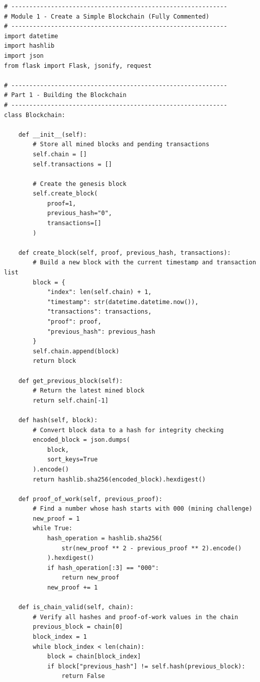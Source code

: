 \documentclass[12pt,a4paper]{article}
\begin{document}
\begin{lstlisting}[style=pythonstyle]
# ------------------------------------------------------------
# Module 1 - Create a Simple Blockchain (Fully Commented)
# ------------------------------------------------------------
import datetime
import hashlib
import json
from flask import Flask, jsonify, request

# ------------------------------------------------------------
# Part 1 - Building the Blockchain
# ------------------------------------------------------------
class Blockchain:

    def __init__(self):
        # Store all mined blocks and pending transactions
        self.chain = []
        self.transactions = []

        # Create the genesis block
        self.create_block(
            proof=1,
            previous_hash="0",
            transactions=[]
        )

    def create_block(self, proof, previous_hash, transactions):
        # Build a new block with the current timestamp and transaction list
        block = {
            "index": len(self.chain) + 1,
            "timestamp": str(datetime.datetime.now()),
            "transactions": transactions,
            "proof": proof,
            "previous_hash": previous_hash
        }
        self.chain.append(block)
        return block

    def get_previous_block(self):
        # Return the latest mined block
        return self.chain[-1]

    def hash(self, block):
        # Convert block data to a hash for integrity checking
        encoded_block = json.dumps(
            block,
            sort_keys=True
        ).encode()
        return hashlib.sha256(encoded_block).hexdigest()

    def proof_of_work(self, previous_proof):
        # Find a number whose hash starts with 000 (mining challenge)
        new_proof = 1
        while True:
            hash_operation = hashlib.sha256(
                str(new_proof ** 2 - previous_proof ** 2).encode()
            ).hexdigest()
            if hash_operation[:3] == "000":
                return new_proof
            new_proof += 1

    def is_chain_valid(self, chain):
        # Verify all hashes and proof-of-work values in the chain
        previous_block = chain[0]
        block_index = 1
        while block_index < len(chain):
            block = chain[block_index]
            if block["previous_hash"] != self.hash(previous_block):
                return False


\end{lstlisting}
\end{document}
